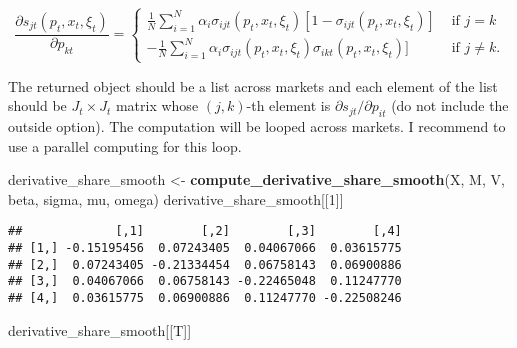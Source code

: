 \documentclass[
]{book}
\newenvironment{Shaded}{\begin{snugshade}}{\end{snugshade}}
\newcommand{\DecValTok}[1]{\textcolor[rgb]{0.00,0.00,0.81}{#1}}
\newcommand{\KeywordTok}[1]{\textcolor[rgb]{0.13,0.29,0.53}{\textbf{#1}}}
\newcommand{\NormalTok}[1]{#1}
\newcommand{\StringTok}[1]{\textcolor[rgb]{0.31,0.60,0.02}{#1}}
\begin{document}
\[
\frac{\partial s_{jt}(p_t, x_t, \xi_t)}{\partial p_{kt}} = 
\begin{cases}
\frac{1}{N} \sum_{i = 1}^N \alpha_i \sigma_{ijt}(p_t, x_t, \xi_t)[1 - \sigma_{ijt}(p_t, x_t, \xi_t)] &\text{   if   } j = k\\
- \frac{1}{N}\sum_{i = 1}^N \alpha_i \sigma_{ijt}(p_t, x_t, \xi_t)\sigma_{ikt}(p_t, x_t, \xi_t)] &\text{   if   } j \neq k.
\end{cases}
\]

The returned object should be a list across markets and each element of the list should be \(J_t \times J_t\) matrix whose \((j, k)\)-th element is \(\partial s_{jt}/\partial p_{it}\) (do not include the outside option). The computation will be looped across markets. I recommend to use a parallel computing for this loop.

\begin{Shaded}
\begin{Highlighting}[]
\NormalTok{derivative_share_smooth <-}
\StringTok{  }\KeywordTok{compute_derivative_share_smooth}\NormalTok{(X, M, V, beta, sigma, mu, omega)}
\NormalTok{derivative_share_smooth[[}\DecValTok{1}\NormalTok{]]}
\end{Highlighting}
\end{Shaded}

\begin{verbatim}
##             [,1]        [,2]        [,3]        [,4]
## [1,] -0.15195456  0.07243405  0.04067066  0.03615775
## [2,]  0.07243405 -0.21334454  0.06758143  0.06900886
## [3,]  0.04067066  0.06758143 -0.22465048  0.11247770
## [4,]  0.03615775  0.06900886  0.11247770 -0.22508246
\end{verbatim}

\begin{Shaded}
\begin{Highlighting}[]
\NormalTok{derivative_share_smooth[[T]]}
\end{Highlighting}
\end{Shaded}
\end{document}
